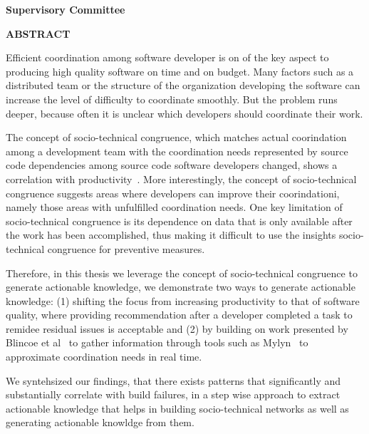 \newpage
{}

\noindent \textbf{Supervisory Committee}
\tpbreak
\panel

\begin{center}
\textbf{ABSTRACT}
\end{center}
Efficient coordination among software developer is on of the key aspect to producing high quality software on time and on budget.
Many factors such as a distributed team or the structure of the organization developing the software can increase the level of difficulty to coordinate smoothly.
But the problem runs deeper, because often it is unclear which developers should coordinate their work.

The concept of socio-technical congruence, which matches actual coorindation among a development team with the coordination needs represented by source code dependencies among source code software developers changed, shows a correlation with productivity~\cite{}.
More interestingly, the concept of socio-technical congruence suggests areas where developers can improve their coorindationi, namely those areas with unfulfilled coordination needs.
One key limitation of socio-technical congruence is its dependence on data that is only available after the work has been accomplished, thus making it difficult to use the insights socio-technical congruence for preventive measures.

Therefore, in this thesis we leverage the concept of socio-technical congruence to generate actionable knowledge, we demonstrate two ways to generate actionable knowledge: (1) shifting the focus from increasing productivity to that of software quality, where providing recommendation after a developer completed a task to remidee residual issues is acceptable and (2) by building on work presented by Blincoe et al~\cite{} to gather information through tools such as Mylyn~\cite{} to approximate coordination needs in real time.

We syntehsized our findings, that there exists patterns that significantly and substantially correlate with build failures, in a step wise approach to extract actionable knowledge that helps in building socio-technical networks as well as generating actionable knowldge from them.
